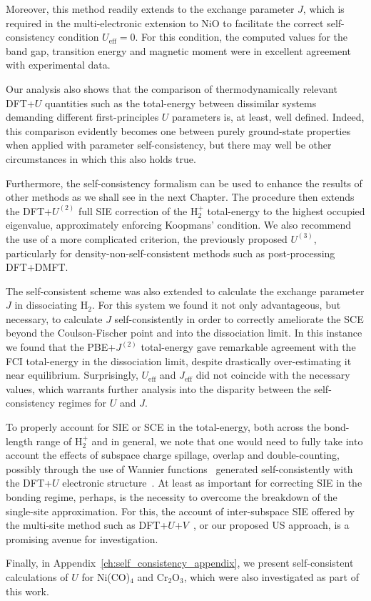 Moreover, 
this method readily extends to the exchange parameter $J$, 
which is required in the multi-electronic extension to NiO  
to facilitate the correct self-consistency condition 
$U_\textrm{eff}=0$.
%
For this condition, the computed values for the  
band gap, transition energy and magnetic moment 
were in excellent agreement with experimental data.

Our analysis also shows that the comparison of 
thermodynamically relevant DFT+$U$
quantities such as the total-energy 
between dissimilar systems demanding different  first-principles
$U$ parameters is, at least, well defined.
%
Indeed, this comparison evidently becomes one
between purely ground-state properties 
when applied with parameter self-consistency, 
but there may well be other circumstances 
in which this also holds true.

Furthermore, 
the self-consistency formalism can 
be used to enhance the results of other methods 
as we shall see in the next Chapter.
%
The procedure then extends the DFT+$U^{(2)}$ 
full SIE correction of the H$_2^+$
total-energy to the highest occupied eigenvalue, 
approximately enforcing Koopmans' condition.
%
We also recommend the use of a more complicated 
criterion, the previously proposed $U^{(3)}$, 
particularly for density-non-self-consistent methods such as 
post-processing DFT+DMFT.


The self-consistent scheme was also extended 
to calculate the exchange parameter $J$ 
in dissociating H$_2$.
%
For this system we found it not only advantageous, 
but necessary, to calculate $J$ self-consistently 
in order to correctly ameliorate the SCE  
beyond the Coulson-Fischer point 
and into the dissociation limit. 
%
In this instance we found that 
the PBE+$J^{(2)}$ total-energy 
gave remarkable agreement with 
the FCI total-energy in the dissociation limit, 
despite drastically over-estimating it 
near equilibrium.
%
{
Surprisingly, 
$U_\textrm{eff}$ and $J_\textrm{eff}$
did not coincide with the necessary values, 
which warrants further analysis into the 
disparity between the self-consistency 
regimes for $U$ and $J$.}

To properly account for SIE or SCE in the total-energy, 
both across the bond-length range of H$_2^+$ and in general, 
we note that one would need to fully take into account 
the effects of subspace charge spillage, overlap and double-counting, 
possibly through the use of 
Wannier functions~\cite{PhysRevB.77.085122} 
generated self-consistently with the DFT+$U$
electronic structure~\cite{PhysRevB.82.081102}.
%
At least as important for correcting SIE in the 
bonding regime, perhaps, is the necessity 
to overcome the breakdown of the 
single-site approximation.
%
For this, the account of inter-subspace SIE 
offered by the multi-site method such as 
DFT+$U$+$V$~\cite{0953-8984-22-5-055602}, 
or our proposed US approach, 
is a promising avenue for  investigation.

Finally, 
in Appendix~\ref{ch:self_consistency_appendix}, 
we present self-consistent calculations of $U$ for 
Ni(CO)$_4$ and Cr$_2$O$_3$, 
which were also investigated as part of this work. 




